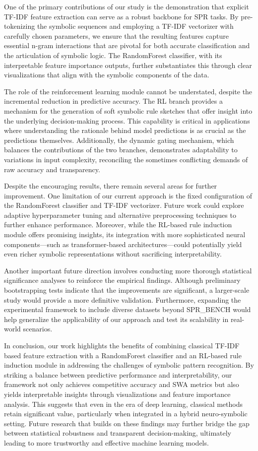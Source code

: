 \documentclass{article}
\begin{document}
One of the primary contributions of our study is the demonstration that explicit TF-IDF feature extraction can serve as a robust backbone for SPR tasks. By pre-tokenizing the symbolic sequences and employing a TF-IDF vectorizer with carefully chosen parameters, we ensure that the resulting features capture essential n-gram interactions that are pivotal for both accurate classification and the articulation of symbolic logic. The RandomForest classifier, with its interpretable feature importance outputs, further substantiates this through clear visualizations that align with the symbolic components of the data.

The role of the reinforcement learning module cannot be understated, despite the incremental reduction in predictive accuracy. The RL branch provides a mechanism for the generation of soft symbolic rule sketches that offer insight into the underlying decision-making process. This capability is critical in applications where understanding the rationale behind model predictions is as crucial as the predictions themselves. Additionally, the dynamic gating mechanism, which balances the contributions of the two branches, demonstrates adaptability to variations in input complexity, reconciling the sometimes conflicting demands of raw accuracy and transparency.

Despite the encouraging results, there remain several areas for further improvement. One limitation of our current approach is the fixed configuration of the RandomForest classifier and TF-IDF vectorizer. Future work could explore adaptive hyperparameter tuning and alternative preprocessing techniques to further enhance performance. Moreover, while the RL-based rule induction module offers promising insights, its integration with more sophisticated neural components—such as transformer-based architectures—could potentially yield even richer symbolic representations without sacrificing interpretability.

Another important future direction involves conducting more thorough statistical significance analyses to reinforce the empirical findings. Although preliminary bootstrapping tests indicate that the improvements are significant, a larger-scale study would provide a more definitive validation. Furthermore, expanding the experimental framework to include diverse datasets beyond SPR\_BENCH would help generalize the applicability of our approach and test its scalability in real-world scenarios.

In conclusion, our work highlights the benefits of combining classical TF-IDF based feature extraction with a RandomForest classifier and an RL-based rule induction module in addressing the challenges of symbolic pattern recognition. By striking a balance between predictive performance and interpretability, our framework not only achieves competitive accuracy and SWA metrics but also yields interpretable insights through visualizations and feature importance analysis. This suggests that even in the era of deep learning, classical methods retain significant value, particularly when integrated in a hybrid neuro-symbolic setting. Future research that builds on these findings may further bridge the gap between statistical robustness and transparent decision-making, ultimately leading to more trustworthy and effective machine learning models.
\end{document}
